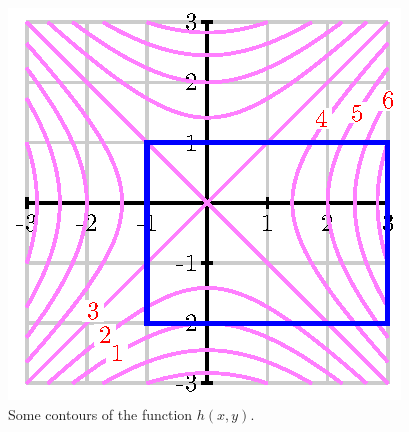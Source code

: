 \begin{activity}
      \begin{figure}[ht]
        \begin{center}
          \includegraphics{figures/fig_11_1_activity_contour.eps}
        \end{center}
        \caption{Some contours of the function $h(x,y)$.}
        \label{F:11.1.activity.contour}
      \end{figure}
    \ea


\end{activity}
\aftera
